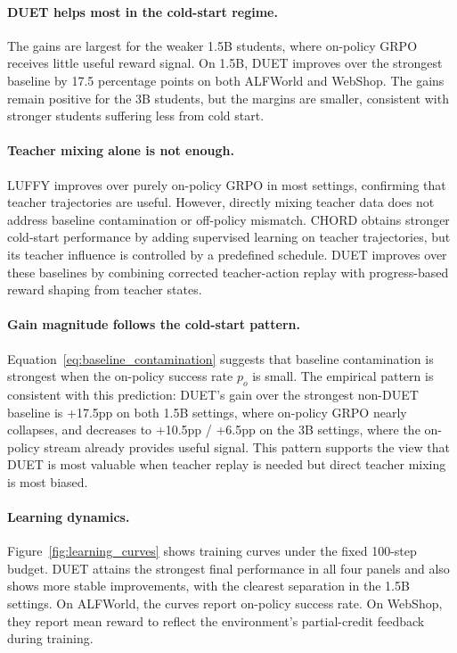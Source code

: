 \paragraph{DUET helps most in the cold-start regime.}
The gains are largest for the weaker 1.5B students, where on-policy GRPO receives little useful reward signal.
On 1.5B, DUET improves over the strongest baseline by 17.5 percentage points on both ALFWorld and WebShop.
The gains remain positive for the 3B students, but the margins are smaller, consistent with stronger students suffering less from cold start.

\paragraph{Teacher mixing alone is not enough.}
LUFFY improves over purely on-policy GRPO in most settings, confirming that teacher trajectories are useful.
However, directly mixing teacher data does not address baseline contamination or off-policy mismatch.
CHORD obtains stronger cold-start performance by adding supervised learning on teacher trajectories, but its teacher influence is controlled by a predefined schedule.
DUET improves over these baselines by combining corrected teacher-action replay with progress-based reward shaping from teacher states.

\paragraph{Gain magnitude follows the cold-start pattern.}
Equation~\eqref{eq:baseline_contamination} suggests that baseline contamination is strongest when the on-policy success rate $p_o$ is small.
The empirical pattern is consistent with this prediction: DUET's gain over the strongest non-DUET baseline is +17.5pp on both 1.5B settings, where on-policy GRPO nearly collapses, and decreases to +10.5pp / +6.5pp on the 3B settings, where the on-policy stream already provides useful signal.
This pattern supports the view that DUET is most valuable when teacher replay is needed but direct teacher mixing is most biased.

\paragraph{Learning dynamics.}
Figure~\ref{fig:learning_curves} shows training curves under the fixed 100-step budget.
DUET attains the strongest final performance in all four panels and also shows more stable improvements, with the clearest separation in the 1.5B settings.
On ALFWorld, the curves report on-policy success rate.
On WebShop, they report mean reward to reflect the environment's partial-credit feedback during training.

